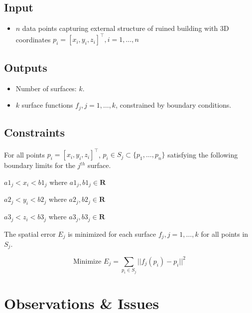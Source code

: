 \documentclass[12pt,a4paper]{article}
\begin{document}
    \subsection{Input}
    
    \begin{itemize}
        \item $n$ data points capturing external structure of ruined building with 3D coordinates $p_i = [x_i, y_i, z_i]^\top, i = 1,\dots,n$
    \end{itemize}
    
    \subsection{Outputs}
    
    \begin{itemize}
        \item Number of surfaces: $k$.
        \item $k$ surface functions $f_j, j=1,\dots,k$, constrained by boundary conditions.
    \end{itemize}
    
    \subsection{Constraints}
    For all points $p_i = [x_i,y_i,z_i]^\top$, $p_i \in S_j \subset \{p_1,\dots,p_n\} $ satisfying the following boundary limits for the $j^{th}$ surface.
    
    \indent $a1_j<x_i<b1_j$ where $a1_j,b1_j \in \mathbf{R}$
    
    \indent $a2_j<y_i<b2_j$ where $a2_j,b2_j \in \mathbf{R}$
    
    \indent $a3_j<z_i<b3_j$ where $a3_j,b3_j \in \mathbf{R}$
    
    \noindent The spatial error $E_j$ is minimized for each surface $f_j, j=1,\dots,k$ for all points in $S_j $.
    
    \begin{equation}
    \textrm{Minimize } E_j = \sum_{p_i \in S_j} {||f_j(p_i) - p_i ||^2} %
    \end{equation}
    
    \section{Observations \& Issues}\label{issues}
    
\end{document}
